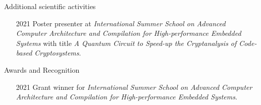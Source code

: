 \documentclass[
	a4paper, %
	11pt, %
]{tresume} %
\begin{document}
\begin{tSection}{Additional scientific activities}
  \begin{itemize}
  \item[2021] Poster presenter at \emph{International Summer School on Advanced
      Computer Architecture and Compilation for High-performance Embedded
      Systems } with title \emph{A Quantum Circuit to Speed-up the Cryptanalysis
      of Code-based Cryptosystems}.
  \end{itemize}
\end{tSection}
\begin{tSection}{Awards and Recognition}
  \begin{itemize}
  \item[2021] Grant winner for \emph{International Summer School on Advanced
      Computer Architecture and Compilation for High-performance Embedded
      Systems}.
  \end{itemize}
\end{tSection}
\vfill
\ifpublic{%
    \ifgdpr{%
    
    
  }
  \fi
}
\fi
\end{document}
